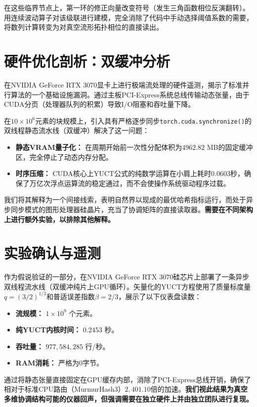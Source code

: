 \documentclass[11pt,a4paper]{article}
\begin{document}
	在这些临界节点上，第一环的修正向量改变符号（发生三角函数相位反演翻转）。用连续波动算子对该级联进行建模，完全消除了代码中手动选择阈值系数的需要，将数列计算转变为对真空流形拓扑相位的直接读出。
	
	\section{硬件优化剖析：双缓冲分析}
	在NVIDIA GeForce RTX 3070显卡上进行极端流处理的硬件遥测，揭示了标准并行算法的一个基础设施漏洞。通过主板PCI-Express系统总线传输动态张量，由于CUDA分页（处理器队列的积累）导致I/O阻塞和吞吐量下降。
	
	在$10 \times 10^6$元素的块规模上，引入具有严格逐步同步\texttt{torch.cuda.synchronize()}的双线程静态流水线（双缓冲）解决了这一问题：
	\begin{itemize}
		\item \textbf{静态VRAM量子化：} 在周期开始前一次性分配体积为$4962.82$ MB的固定缓冲区，完全停止了动态内存分配。
		\item \textbf{时序压缩：} CUDA核心上YUCT公式的纯数学运算在小肩上耗时$0.0603$秒，确保了万亿次浮点运算流的稳定通过，而不会使操作系统驱动程序过载。
	\end{itemize}
	我们将其解释为一个间接线索，表明自然界以现成的最优哈希指标运行，而处于异步同步模式的图形处理器硅晶片，充当了协调矩阵的直接读取器。\textbf{需要在不同架构上进行额外实验，以排除其他解释。}
	
	\section{实验确认与遥测}
	作为假说验证的一部分，在NVIDIA GeForce RTX 3070硅芯片上部署了一条异步双线程流水线（双缓冲纯片上GPU循环）。矢量化的YUCT方程使用了质量标度量$q = (3/2)^{1/3}$和普适误差指数$\beta = 2/3$，展示了以下仪表盘读数：
	\begin{itemize}
		\item \textbf{流规模：} $1 \times 10^9$ 个元素。
		\item \textbf{纯YUCT内核时间：} $0.2453$ 秒。
		\item \textbf{吞吐量：} $977,584,285$ 行/秒。
		\item \textbf{RAM消耗：} 严格为$0$字节。
	\end{itemize}
	
	通过将静态张量直接固定在GPU缓存内部，消除了PCI-Express总线开销，确保了相对于标准CPU路由（MurmurHash3）$2,401.10$倍的加速。\textbf{我们视此结果为真空多维协调结构可能的仪器回声，但强调需要在独立硬件上并由独立团队进行复现。}
	
\end{document}
